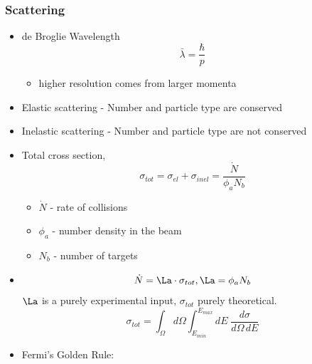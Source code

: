 \documentclass[a4paper, 11pt, normalem]{report}
\begin{document}
\part{}
\chapter{}
\section{Scattering}
\begin{itemize}
    \item de Broglie Wavelength
        \begin{equation}
            \bar{\lambda} = \frac{\hbar}{p}
        \end{equation}
        \begin{itemize}
            \item higher resolution comes from larger momenta
        \end{itemize}
    \item Elastic scattering - Number and particle type are conserved
    \item Inelastic scattering - Number and particle type are not conserved
    \item Total cross section, 
        \begin{equation}
            \sigma_{tot} = \sigma_{el} + \sigma_{inel} = \frac{\dot{N}}{\phi_aN_b}
        \end{equation}
        \begin{itemize}
            \item $\dot{N}$ - rate of collisions
            \item $\phi_a$ - number density in the beam
            \item $N_b$ - number of targets
        \end{itemize}
    \item 
        \begin{equation}
            \dot{N} = \La \cdot \sigma_{tot}, \La = \phi_aN_b
        \end{equation}
        $\La$ is a purely experimental input, $\sigma_{tot}$ purely theoretical.
        \begin{equation}
            \sigma_{tot} = \int_{\Omega} d\Omega \int_{E_{min}}^{E_{max}} dE\;\frac{d\sigma}{d\Omega\,dE}
        \end{equation}
    \item Fermi's Golden Rule:
        \begin{align}

\end{align}
\end{itemize}
\end{document}

